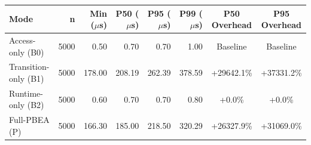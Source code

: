 \begin{tabular}{lrrrrrcc}
\toprule
Mode & n & Min ($\mu$s) & P50 ($\mu$s) & P95 ($\mu$s) & P99 ($\mu$s) & P50 Overhead & P95 Overhead \\
\midrule
Access-only (B0) & 5000 & 0.50 & 0.70 & 0.70 & 1.00 & Baseline & Baseline \\
Transition-only (B1) & 5000 & 178.00 & 208.19 & 262.39 & 378.59 & +29642.1\% & +37331.2\% \\
Runtime-only (B2) & 5000 & 0.60 & 0.70 & 0.70 & 0.80 & +0.0\% & +0.0\% \\
Full-PBEA (P) & 5000 & 166.30 & 185.00 & 218.50 & 320.29 & +26327.9\% & +31069.0\% \\
\bottomrule
\end{tabular}
